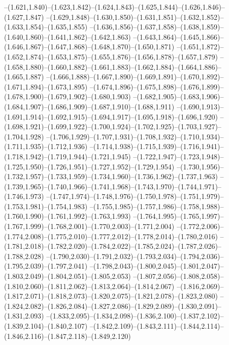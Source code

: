   --(1.621,1.840)--(1.623,1.842)--(1.624,1.843)--(1.625,1.844)--(1.626,1.846)--(1.627,1.847)%
  --(1.629,1.848)--(1.630,1.850)--(1.631,1.851)--(1.632,1.852)--(1.633,1.854)--(1.635,1.855)%
  --(1.636,1.856)--(1.637,1.858)--(1.638,1.859)--(1.640,1.860)--(1.641,1.862)--(1.642,1.863)%
  --(1.643,1.864)--(1.645,1.866)--(1.646,1.867)--(1.647,1.868)--(1.648,1.870)--(1.650,1.871)%
  --(1.651,1.872)--(1.652,1.874)--(1.653,1.875)--(1.655,1.876)--(1.656,1.878)--(1.657,1.879)%
  --(1.658,1.880)--(1.660,1.882)--(1.661,1.883)--(1.662,1.884)--(1.664,1.886)--(1.665,1.887)%
  --(1.666,1.888)--(1.667,1.890)--(1.669,1.891)--(1.670,1.892)--(1.671,1.894)--(1.673,1.895)%
  --(1.674,1.896)--(1.675,1.898)--(1.676,1.899)--(1.678,1.900)--(1.679,1.902)--(1.680,1.903)%
  --(1.682,1.905)--(1.683,1.906)--(1.684,1.907)--(1.686,1.909)--(1.687,1.910)--(1.688,1.911)%
  --(1.690,1.913)--(1.691,1.914)--(1.692,1.915)--(1.694,1.917)--(1.695,1.918)--(1.696,1.920)%
  --(1.698,1.921)--(1.699,1.922)--(1.700,1.924)--(1.702,1.925)--(1.703,1.927)--(1.704,1.928)%
  --(1.706,1.929)--(1.707,1.931)--(1.708,1.932)--(1.710,1.934)--(1.711,1.935)--(1.712,1.936)%
  --(1.714,1.938)--(1.715,1.939)--(1.716,1.941)--(1.718,1.942)--(1.719,1.944)--(1.721,1.945)%
  --(1.722,1.947)--(1.723,1.948)--(1.725,1.950)--(1.726,1.951)--(1.727,1.952)--(1.729,1.954)%
  --(1.730,1.956)--(1.732,1.957)--(1.733,1.959)--(1.734,1.960)--(1.736,1.962)--(1.737,1.963)%
  --(1.739,1.965)--(1.740,1.966)--(1.741,1.968)--(1.743,1.970)--(1.744,1.971)--(1.746,1.973)%
  --(1.747,1.974)--(1.748,1.976)--(1.750,1.978)--(1.751,1.979)--(1.753,1.981)--(1.754,1.983)%
  --(1.755,1.985)--(1.757,1.986)--(1.758,1.988)--(1.760,1.990)--(1.761,1.992)--(1.763,1.993)%
  --(1.764,1.995)--(1.765,1.997)--(1.767,1.999)--(1.768,2.001)--(1.770,2.003)--(1.771,2.004)%
  --(1.772,2.006)--(1.774,2.008)--(1.775,2.010)--(1.777,2.012)--(1.778,2.014)--(1.780,2.016)%
  --(1.781,2.018)--(1.782,2.020)--(1.784,2.022)--(1.785,2.024)--(1.787,2.026)--(1.788,2.028)%
  --(1.790,2.030)--(1.791,2.032)--(1.793,2.034)--(1.794,2.036)--(1.795,2.039)--(1.797,2.041)%
  --(1.798,2.043)--(1.800,2.045)--(1.801,2.047)--(1.803,2.049)--(1.804,2.051)--(1.805,2.053)%
  --(1.807,2.056)--(1.808,2.058)--(1.810,2.060)--(1.811,2.062)--(1.813,2.064)--(1.814,2.067)%
  --(1.816,2.069)--(1.817,2.071)--(1.818,2.073)--(1.820,2.075)--(1.821,2.078)--(1.823,2.080)%
  --(1.824,2.082)--(1.826,2.084)--(1.827,2.086)--(1.829,2.089)--(1.830,2.091)--(1.831,2.093)%
  --(1.833,2.095)--(1.834,2.098)--(1.836,2.100)--(1.837,2.102)--(1.839,2.104)--(1.840,2.107)%
  --(1.842,2.109)--(1.843,2.111)--(1.844,2.114)--(1.846,2.116)--(1.847,2.118)--(1.849,2.120)%
